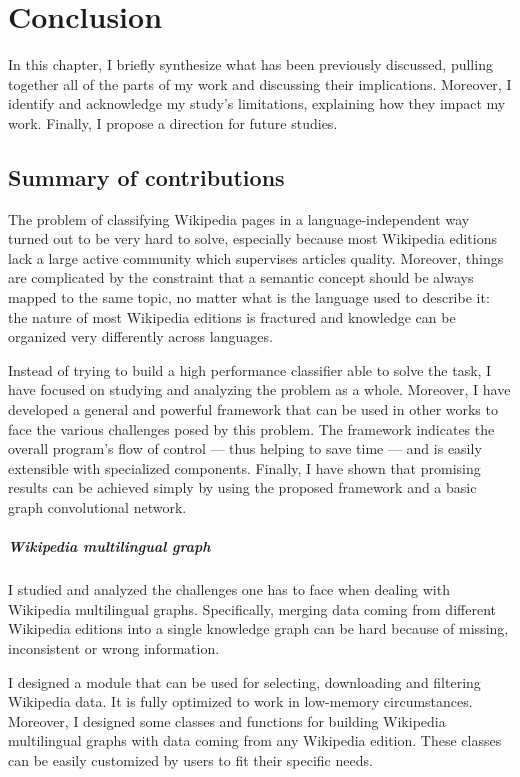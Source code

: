 \chapter{Conclusion}
    In this chapter, I briefly synthesize what has been previously discussed, pulling together all of the parts of my work and discussing their implications. Moreover, I identify and acknowledge my study's limitations, explaining how they impact my work. Finally, I propose a direction for future studies.
    \section{Summary of contributions}
        The problem of classifying Wikipedia pages in a language-independent way turned out to be very hard to solve, especially because most Wikipedia editions lack a large active community which supervises articles quality. Moreover, things are complicated by the constraint that a semantic concept should be always mapped to the same topic, no matter what is the language used to describe it: the nature of most Wikipedia editions is fractured and knowledge can be organized very differently across languages.
        
        Instead of trying to build a high performance classifier able to solve the task, I have focused on studying and analyzing the problem as a whole. Moreover, I have developed a general and powerful framework that can be used in other works to face the various challenges posed by this problem. The framework indicates the overall program's flow of control --- thus helping to save time --- and is easily extensible with specialized components. Finally, I have shown that promising results can be achieved simply by using the proposed framework and a basic graph convolutional network.
        
        \paragraph{Wikipedia multilingual graph}
            I studied and analyzed the challenges one has to face when dealing with Wikipedia multilingual graphs. Specifically, merging data coming from different Wikipedia editions into a single knowledge graph can be hard because of missing, inconsistent or wrong information.
            
            I designed a module that can be used for selecting, downloading and filtering Wikipedia data. It is fully optimized to work in low-memory circumstances. Moreover, I designed some classes and functions for building Wikipedia multilingual graphs with data coming from any Wikipedia edition. These classes can be easily customized by users to fit their specific needs.
            

